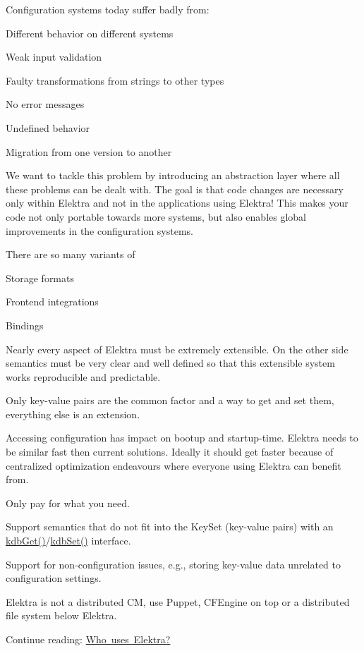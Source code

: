 Configuration systems today suffer badly from\+:


\begin{DoxyItemize}
\item Different behavior on different systems
\item Weak input validation
\item Faulty transformations from strings to other types
\item No error messages
\item Undefined behavior
\item Migration from one version to another
\end{DoxyItemize}

We want to tackle this problem by introducing an abstraction layer where all these problems can be dealt with. The goal is that code changes are necessary only within Elektra and not in the applications using Elektra! This makes your code not only portable towards more systems, but also enables global improvements in the configuration systems.

There are so many variants of


\begin{DoxyItemize}
\item Storage formats
\item Frontend integrations
\item Bindings
\end{DoxyItemize}

Nearly every aspect of Elektra must be extremely extensible. On the other side semantics must be very clear and well defined so that this extensible system works reproducible and predictable.

Only key-\/value pairs are the common factor and a way to get and set them, everything else is an extension.

Accessing configuration has impact on bootup and startup-\/time. Elektra needs to be similar fast then current solutions. Ideally it should get faster because of centralized optimization endeavours where everyone using Elektra can benefit from.

Only pay for what you need.


\begin{DoxyItemize}
\item Support semantics that do not fit into the Key\+Set (key-\/value pairs) with an {\ttfamily \mbox{\hyperlink{group__kdb_ga28e385fd9cb7ccfe0b2f1ed2f62453a1}{kdb\+Get()}}}/{\ttfamily \mbox{\hyperlink{group__kdb_ga11436b058408f83d303ca5e996832bcf}{kdb\+Set()}}} interface.
\item Support for non-\/configuration issues, e.\+g., storing key-\/value data unrelated to configuration settings.
\item Elektra is not a distributed CM, use Puppet, C\+F\+Engine on top or a distributed file system below Elektra.
\end{DoxyItemize}


\begin{DoxyItemize}
\item Continue reading\+: \mbox{\hyperlink{doc_WHO_md}{Who uses Elektra?}} 
\end{DoxyItemize}